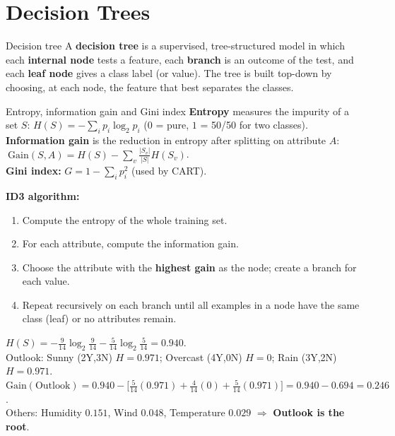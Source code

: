
\section{Decision Trees}
\begin{dfn}{Decision tree}
A \textbf{decision tree} is a supervised, tree-structured model in which each \textbf{internal node} tests a feature, each \textbf{branch} is an outcome of the test, and each \textbf{leaf node} gives a class label (or value). The tree is built top-down by choosing, at each node, the feature that best separates the classes.
\end{dfn}

\begin{dfn}{Entropy, information gain and Gini index}
\textbf{Entropy} measures the impurity of a set $S$: $H(S)=-\sum_ip_i\log_2p_i$ ($0$ = pure, $1$ = 50/50 for two classes).\\
\textbf{Information gain} is the reduction in entropy after splitting on attribute $A$:
$\ \mathrm{Gain}(S,A)=H(S)-\sum_v\frac{|S_v|}{|S|}H(S_v)$.\\
\textbf{Gini index:} $G=1-\sum_ip_i^2$ (used by CART).
\end{dfn}

\textbf{ID3 algorithm:}
\begin{enumerate}
  \item Compute the entropy of the whole training set.
  \item For each attribute, compute the information gain.
  \item Choose the attribute with the \textbf{highest gain} as the node; create a branch for each value.
  \item Repeat recursively on each branch until all examples in a node have the same class (leaf) or no attributes remain.
\end{enumerate}

\begin{numer}
$H(S)=-\frac9{14}\log_2\frac9{14}-\frac5{14}\log_2\frac5{14}=\mathbf{0.940}$.\\
Outlook: Sunny (2Y,3N) $H=0.971$; Overcast (4Y,0N) $H=0$; Rain (3Y,2N) $H=0.971$.\\
$\mathrm{Gain}(\text{Outlook})=0.940-\big[\frac5{14}(0.971)+\frac4{14}(0)+\frac5{14}(0.971)\big]=0.940-0.694=\mathbf{0.246}$.\\
Others: Humidity $0.151$, Wind $0.048$, Temperature $0.029$ $\Rightarrow$ \textbf{Outlook is the root}.
\end{numer}

